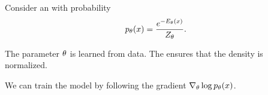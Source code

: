 Consider an  with probability
\[
p_{\iperpaper{theta}{\theta}}(x)
= \frac{e^{-\iperpaper{energy}{E_\theta(x)}}}{\iperpaper{partition}{Z_\theta}}.
\]

The parameter $\iperpaper{theta}{\theta}$ is learned from data. The  ensures that the density is normalized.

We can train the model by following the gradient $\iperpaper{gradient}{\nabla_\theta \log p_\theta(x)}$.

